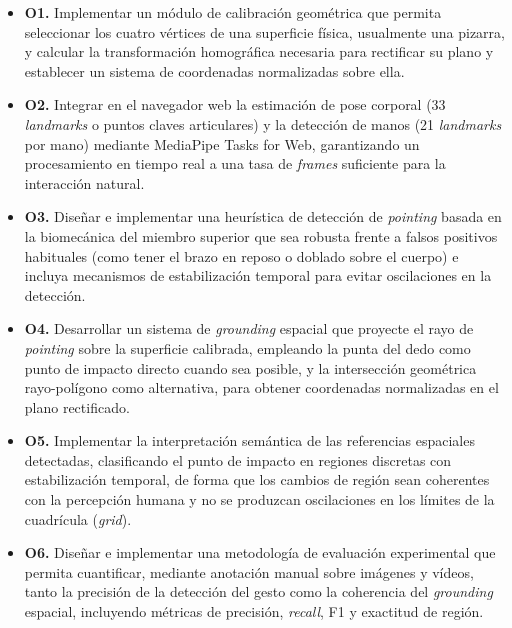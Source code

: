 \documentclass[12pt]{report} %
\begin{document}
\begin{itemize}
    \item \textbf{O1.} Implementar un módulo de calibración geométrica que permita seleccionar los cuatro vértices de una superficie física, usualmente una pizarra, y calcular la transformación homográfica necesaria para rectificar su plano y establecer un sistema de coordenadas normalizadas sobre ella.

    \item \textbf{O2.} Integrar en el navegador web la estimación de pose corporal (33 \textit{landmarks} o puntos claves articulares) y la detección de manos (21 \textit{landmarks} por mano) mediante MediaPipe Tasks for Web, garantizando un procesamiento en tiempo real a una tasa de \textit{frames} suficiente para la interacción natural.

    \item \textbf{O3.} Diseñar e implementar una heurística de detección de \textit{pointing} basada en la biomecánica del miembro superior que sea robusta frente a falsos positivos habituales (como tener el brazo en reposo o doblado sobre el cuerpo) e incluya mecanismos de estabilización temporal para evitar oscilaciones en la detección.

    \item \textbf{O4.} Desarrollar un sistema de \textit{grounding} espacial que proyecte el rayo de \textit{pointing} sobre la superficie calibrada, empleando la punta del dedo como punto de impacto directo cuando sea posible, y la intersección geométrica rayo-polígono como alternativa, para obtener coordenadas normalizadas en el plano rectificado.

    \item \textbf{O5.} Implementar la interpretación semántica de las referencias espaciales detectadas, clasificando el punto de impacto en regiones discretas con estabilización temporal, de forma que los cambios de región sean coherentes con la percepción humana y no se produzcan oscilaciones en los límites de la cuadrícula (\textit{grid}).

    \item \textbf{O6.} Diseñar e implementar una metodología de evaluación experimental que permita cuantificar, mediante anotación manual sobre imágenes y vídeos, tanto la precisión de la detección del gesto como la coherencia del \textit{grounding} espacial, incluyendo métricas de precisión, \textit{recall}, F1 y exactitud de región.
\end{itemize}
\end{document}
